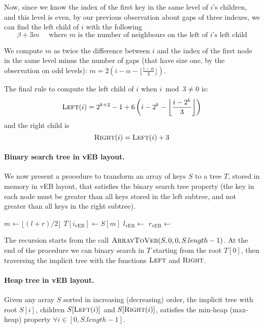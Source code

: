 Now, since we know the index of the first key in the same level of $i$'s children, and this level is even, by our previous observation about gaps of three indexes, we can find the left child of $i$ with the following $$\beta+3m \quad \text{ where $m$ is the number of neighbours on the left of $i$'s left child}$$

We compute $m$ as twice the difference between $i$ and the index of the first node in the same level minus the number of gaps (that have size one, by the observation on odd levels): $m=2(i-\alpha-\lfloor \frac{i-\alpha}{3} \rfloor)$.

The final rule to compute the left child of $i$ when $i \bmod 3 \neq 0$ is: $$\textsc{Left}(i)=2^{k+2}-1+6\left(i-2^k- \left\lfloor \frac{i-2^k}{3} \right\rfloor\right)$$ and the right child is $$\textsc{Right}(i)=\textsc{Left}(i)+3$$

\paragraph{Binary search tree in vEB layout.} We now present a procedure to transform an array of keys $S$ to a tree $T$, stored in memory in vEB layout, that satisfies the binary search tree property (the key in each node must be greater than all keys stored in the left subtree, and not greater than all keys in the right subtree).
\begin{algorithmic}[1]
      \State \Return{}
    \EndIf
    \State $m \gets \lfloor (l+r)/2 \rfloor$
    \State $T[i_{\text{vEB}}] \gets S[m]$ 
    \State $l_{\text{vEB}} \gets $ 
    \State $r_{\text{vEB}} \gets $ 
    \State {}
    \State {}
  \EndFunction
\end{algorithmic}
The recursion starts from the call $\textsc{ArrayToVeb}(S, 0, 0, S.length-1)$. At the end of the procedure we can binary search in $T$ starting from the root $T[0]$, then traversing the implicit tree with the functions $\textsc{Left}$ and $\textsc{Right}$.

\paragraph{Heap tree in vEB layout.}  Given any array $S$ sorted in increasing (decreasing) order, the implicit tree with root $S[i]$, children $S[\textsc{Left}(i)]$ and $S[\textsc{Right}(i)]$, satisfies the min-heap (max-heap) property $\forall i \in [0, S.length-1]$. 

